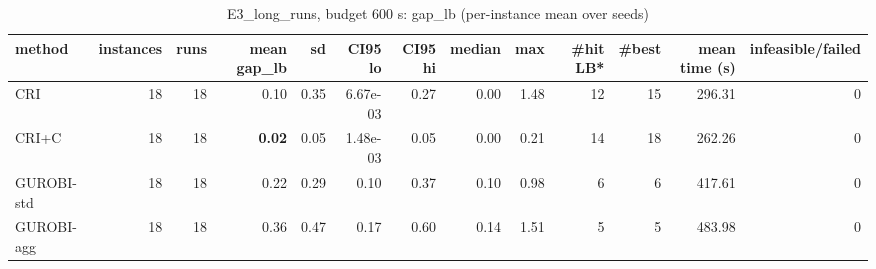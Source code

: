 \begin{table}[htbp]
\centering
\small
\caption{E3\_long\_runs, budget 600 s: gap\_lb (per-instance mean over seeds)}
\label{tab:E3_long_runs_b600_summary}
\begin{tabular}{lrrrrrrrrrrrr}
\toprule
method & instances & runs & mean gap\_lb & sd & CI95 lo & CI95 hi & median & max & \#hit LB* & \#best & mean time (s) & infeasible/failed \\
\midrule
CRI & 18 & 18 & 0.10 & 0.35 & 6.67e-03 & 0.27 & 0.00 & 1.48 & 12 & 15 & 296.31 & 0 \\
CRI+C & 18 & 18 & \textbf{0.02} & 0.05 & 1.48e-03 & 0.05 & 0.00 & 0.21 & 14 & 18 & 262.26 & 0 \\
GUROBI-std & 18 & 18 & 0.22 & 0.29 & 0.10 & 0.37 & 0.10 & 0.98 & 6 & 6 & 417.61 & 0 \\
GUROBI-agg & 18 & 18 & 0.36 & 0.47 & 0.17 & 0.60 & 0.14 & 1.51 & 5 & 5 & 483.98 & 0 \\
\bottomrule
\end{tabular}
\end{table}
